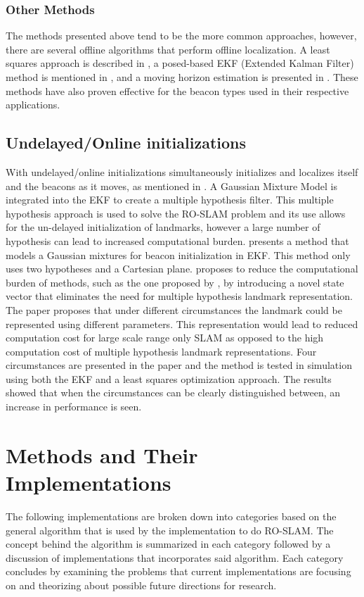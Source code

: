 \documentclass[conference]{IEEEtran}
\begin{document}
			\subsubsection{Other Methods}
			 	The methods presented above tend to be the more common approaches, however, there are several offline algorithms that perform offline localization. A least squares approach is described in \cite{Newman}, a posed-based EKF (Extended Kalman Filter) method is mentioned in \cite{Webster2012}, and a moving horizon estimation is presented in \cite{Vallicrosa2014a}. These methods have also proven effective for the beacon types used in their respective applications.
			

		\subsection{Undelayed/Online initializations}
			With undelayed/online initializations simultaneously initializes and localizes itself and the beacons as it moves, as mentioned in \cite{Caballero2010}. A Gaussian Mixture Model is integrated into the EKF to create a multiple hypothesis filter.  This multiple hypothesis approach is used to solve the RO-SLAM problem and its use allows for the un-delayed initialization of landmarks, however a large number of hypothesis can lead to increased computational burden. \cite{Geneve2015} presents a method that models a Gaussian mixtures for beacon initialization in EKF. This method only uses two hypotheses and a Cartesian plane. \cite{Ahmad2011a} proposes to reduce the computational burden of methods, such as the one proposed by \cite{Caballero2010}, by introducing a novel state vector that eliminates the need for multiple hypothesis landmark representation. The paper proposes that under different circumstances the landmark could be represented using different parameters. This representation would lead to reduced computation cost for large scale range only SLAM as opposed to the high computation cost of multiple hypothesis landmark representations. Four circumstances are presented in the paper and the method is tested in simulation using both the EKF and a least squares optimization approach. The results showed that when the circumstances can be clearly distinguished between, an increase in performance is seen.



	
	

	\section{Methods and Their Implementations}
	\label{methods and their implementations}
	The following implementations are broken down into categories based on the general algorithm that is used by the implementation to do RO-SLAM. The concept behind the algorithm is summarized in each category followed by a discussion of implementations that incorporates said algorithm. Each category concludes by examining the problems that current implementations are focusing on and theorizing about possible future directions for research.  
\end{document}
